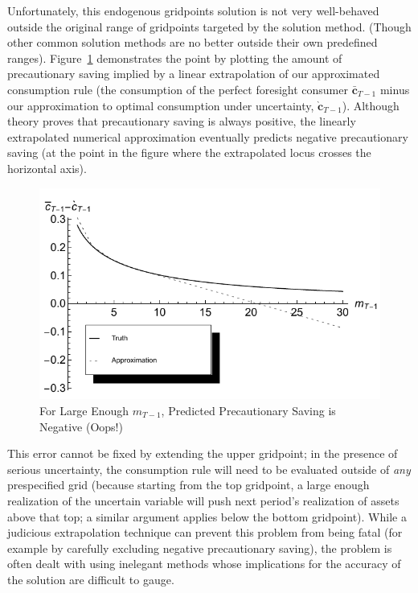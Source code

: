 \documentclass[twocolumn, switch]{article}
\newcommand{\mNrm}{m}
\newcommand{\cFunc}{\mathbf{c}}
\newcommand{\cFuncOpt}{\bar{\cFunc}}
\newcommand{\cFuncApprox}{\grave{\cFunc}}
\begin{document}
Unfortunately, this endogenous gridpoints solution is not very well-behaved
outside the original range of gridpoints targeted by the solution method.
(Though other common solution methods are no better outside their own predefined
ranges). Figure~\ref{fig:ExtrapProblem} demonstrates the point by plotting the amount
of precautionary saving implied by a linear extrapolation of our approximated
consumption rule (the consumption of the perfect foresight consumer
$\cFuncOpt_{T -1}$ minus our approximation to optimal consumption under
uncertainty, $\cFuncApprox_{T -1}$). Although theory proves that precautionary
saving is always positive, the linearly extrapolated numerical approximation
eventually predicts negative precautionary saving (at the point in the figure
where the extrapolated locus crosses the horizontal axis).

\begin{figure}[!htbp]
\centering
\includegraphics[width=0.8\linewidth]{files/ExtrapProblemPlot-3aca7a9ea92a117508bb3b02a78921ba.pdf}
\caption[]{For Large Enough $\mNrm_{T -1}$, Predicted Precautionary Saving is Negative (Oops!)}
\label{fig:ExtrapProblem}
\end{figure}

This error cannot be fixed by extending the upper gridpoint; in the presence of
serious uncertainty, the consumption rule will need to be evaluated outside of
\textit{any} prespecified grid (because starting from the top gridpoint, a large enough
realization of the uncertain variable will push next period's realization of
assets above that top; a similar argument applies below the bottom gridpoint).
While a judicious extrapolation technique can prevent this problem from being
fatal (for example by carefully excluding negative precautionary saving), the
problem is often dealt with using inelegant methods whose implications for the
accuracy of the solution are difficult to gauge.
\end{document}
